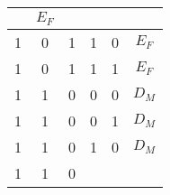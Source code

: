 \begin{table}[!htb]
\begin{tabular}{|ccccc|c|}
       & {\color[HTML]{FE0000} $E_F$}                                     \\ \hline
{\color[HTML]{00009B} 1}                                     & {\color[HTML]{00009B} 0}                                    & {\color[HTML]{00009B} 1} 
 
                                  & {\color[HTML]{00009B} 1}                                    & {\color[HTML]{00009B} 0}                            
 
       & {\color[HTML]{FE0000} $E_F$}                                     \\ \hline
{\color[HTML]{00009B} 1}                                     & {\color[HTML]{00009B} 0}                                    & {\color[HTML]{00009B} 1} 
 
                                  & {\color[HTML]{00009B} 1}                                    & {\color[HTML]{00009B} 1}                            
 
       & {\color[HTML]{FE0000} $E_F$}                                     \\ \hline
{\color[HTML]{00009B} 1}                                     & {\color[HTML]{00009B} 1}                                    & {\color[HTML]{00009B} 0} 
 
                                  & {\color[HTML]{00009B} 0}                                    & {\color[HTML]{00009B} 0}                            
 
       & {\color[HTML]{FE0000} $D_M$}                                     \\ \hline
{\color[HTML]{00009B} 1}                                     & {\color[HTML]{00009B} 1}                                    & {\color[HTML]{00009B} 0} 
 
                                  & {\color[HTML]{00009B} 0}                                    & {\color[HTML]{00009B} 1}                            
 
       & {\color[HTML]{FE0000} $D_M$}                                     \\ \hline
{\color[HTML]{00009B} 1}                                     & {\color[HTML]{00009B} 1}                                    & {\color[HTML]{00009B} 0} 
 
                                  & {\color[HTML]{00009B} 1}                                    & {\color[HTML]{00009B} 0}                            
 
       & {\color[HTML]{FE0000} $D_M$}                                     \\ \hline
{\color[HTML]{00009B} 1}                                     & {\color[HTML]{00009B} 1}                                    & {\color[HTML]{00009B} 0} 
 

\end{tabular}
\end{table}
